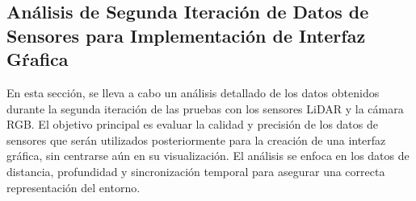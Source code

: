 \subsection{An\'alisis de Segunda Iteraci\'on de Datos de Sensores para Implementaci\'on de Interfaz G\'rafica} %

    En esta secci\'on, se lleva a cabo un an\'alisis detallado de los datos obtenidos durante la 
        segunda iteraci\'on de las pruebas con los sensores LiDAR y la c\'amara RGB. El objetivo 
        principal es evaluar la calidad y precisi\'on de los datos de sensores que ser\'an utilizados 
        posteriormente para la creaci\'on de una interfaz gr\'afica, sin centrarse a\'un en su visualizaci\'on. 
        El an\'alisis se enfoca en los datos de distancia, profundidad y sincronizaci\'on temporal para asegurar 
        una correcta representaci\'on del entorno.
    \vskip 0.5cm
